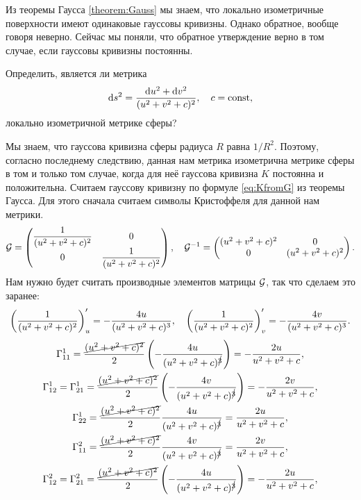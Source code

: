 Из теоремы Гаусса \ref{theorem:Gauss} мы знаем, что локально изометричные поверхности имеют одинаковые гауссовы кривизны. Однако обратное, вообще говоря неверно. Сейчас мы поняли, что обратное утверждение верно в том случае, если гауссовы кривизны постоянны.

\begin{problem}
	Определить, является ли метрика
	\[
		\mathop{}\!\mathrm{d} s^2 = \frac{\mathop{}\!\mathrm{d} u^2 + \mathop{}\!\mathrm{d} v^2}{(u^2 + v^2 + c)^2},\quad c = \mathrm{const},
	\]
	локально изометричной метрике сферы?
\end{problem}

\begin{solution}
	Мы знаем, что гауссова кривизна сферы радиуса $R$ равна $1 / R^2$. Поэтому, согласно последнему следствию, данная нам метрика изометрична метрике сферы в том и только том случае, когда для неё гауссова кривизна $K$ постоянна и положительна. Считаем гауссову кривизну по формуле \eqref{eq:KfromG} из теоремы Гаусса. Для этого сначала считаем символы Кристоффеля для данной нам метрики.
	\[
		\mathcal{G} =
		\begin{pmatrix}
			\dfrac{1}{(u^2 + v^2 + c)^2} & 0\\
			0 & \dfrac{1}{(u^2 + v^2 + c)^2}
		\end{pmatrix},\quad
		\mathcal{G}^{-1} =
		\begin{pmatrix}
			(u^2 + v^2 + c)^2 & 0\\
			0 & (u^2 + v^2 + c)^2
		\end{pmatrix}.
	\]
	Нам нужно будет считать производные элементов матрицы $\mathcal{G}$, так что сделаем это заранее:
	\[
		\left(\frac{1}{(u^2 + v^2 + c)^2}\right)^\prime_{u} = -\frac{4u}{(u^2 + v^2 + c)^3},\quad
		\left(\frac{1}{(u^2 + v^2 + c)^2}\right)^\prime_{v} = -\frac{4v}{(u^2 + v^2 + c)^3}.
	\]
	\begin{gather*}
		\Gamma_{11}^1 = \frac{\cancel{(u^2 + v^2 + c)^2}}{2}\br{-\frac{4u}{(u^2 + v^2 + c)^{\cancel{3}}}} = -\frac{2u}{u^2 + v^2 + c},\\
		\Gamma_{12}^1 = \Gamma_{21}^1 = \frac{\cancel{(u^2 + v^2 + c)^2}}{2}\br{-\frac{4v}{(u^2 + v^2 + c)^{\cancel{3}}}} = -\frac{2v}{u^2 + v^2 + c},\\
		\Gamma_{22}^1 = \frac{\cancel{(u^2 + v^2 + c)^2}}{2}\frac{4u}{(u^2 + v^2 + c)^{\cancel{3}}} = \frac{2u}{u^2 + v^2 + c},\\
		\Gamma_{11}^2 = \frac{\cancel{(u^2 + v^2 + c)^2}}{2}\frac{4v}{(u^2 + v^2 + c)^{\cancel{3}}} = \frac{2v}{u^2 + v^2 + c},\\
		\Gamma_{12}^2 = \Gamma_{21}^2 = \frac{\cancel{(u^2 + v^2 + c)^2}}{2}\br{-\frac{4u}{(u^2 + v^2 + c)^{\cancel{3}}}} = -\frac{2u}{u^2 + v^2 + c},\\

\end{gather*}
\end{solution}
